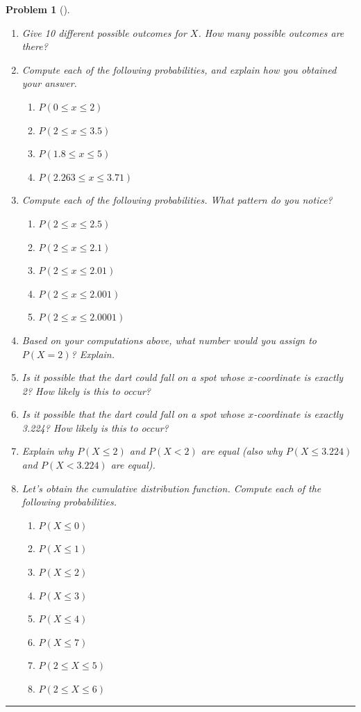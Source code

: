 \documentclass[letterpaper,oneside]{book}%
\theoremstyle{plain}
\theoremstyle{box}
\theoremstyle{problem}
\newtheorem{problemnum}{Problem}[chapter]
\newenvironment{problem}[1][]{\begin{problemnum}[#1]}{\end{problemnum}\nopagebreak\hrule\bigskip}
\begin{document}
\begin{problem}
\begin{enumerate}
  \item Give 10 different possible outcomes for $X$. How many possible outcomes are there?
  \item Compute each of the following probabilities, and explain how you obtained your answer.
   \begin{enumerate}
    \item $P(0\leq x\leq 2)$
    \item $P(2\leq x\leq 3.5)$
    \item $P(1.8\leq x\leq 5)$
    \item $P(2.263\leq x\leq 3.71)$
   \end{enumerate}
  \item Compute each of the following probabilities. What pattern do you notice? 
   \begin{enumerate}
    \item $P(2\leq x\leq 2.5)$
    \item $P(2\leq x\leq 2.1)$
    \item $P(2\leq x\leq 2.01)$
    \item $P(2\leq x\leq 2.001)$
    \item $P(2\leq x\leq 2.0001)$
   \end{enumerate}
  \item Based on your computations above, what number would you assign to $P(X=2)$?  Explain.  
  \item Is it possible that the dart could fall on a spot whose $x$-coordinate is exactly 2? How likely is this to occur?
   \item Is it possible that the dart could fall on a spot whose $x$-coordinate is exactly 3.224? How likely is this to occur?
  \item Explain why $P(X\leq 2)$ and $P(X<2)$ are equal (also why $P(X\leq 3.224)$ and $P(X<3.224)$ are equal).
  \item Let's obtain the cumulative distribution function. Compute each of the following probabilities. 
   \begin{enumerate}
    \item $P(X\leq 0)$
    \item $P(X\leq 1)$
    \item $P(X\leq 2)$
    \item $P(X\leq 3)$
    \item $P(X\leq 4)$
    \item $P(X\leq 7)$
    \item $P(2\leq X\leq 5)$
    \item $P(2\leq X\leq 6)$

\end{enumerate}
\end{enumerate}
\end{problem}
\end{document}
